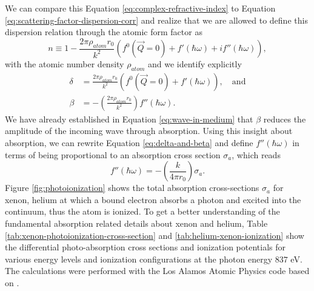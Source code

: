 We can compare this Equation \eqref{eq:complex-refractive-index} to Equation \eqref{eq:scattering-factor-dispersion-corr} and realize that we are allowed to define this dispersion relation through the atomic form factor as \citep[see][p.~76]{Als-Nielson-2011-JWS}
\begin{equation}
n\equiv 1- \frac{2\pi \rho_{atom}r_{0}}{k^{2}}\left(f^{0}\left(\vec{Q}=0\right)+f'\left(\hbar\omega\right)+i f''\left(\hbar\omega\right)\right),
\label{eq:eq:complex-refractive-index-atomic-factors}
\end{equation}
with the atomic number density $\rho_{atom}$ and we identify explicitly
\begin{align}
\delta &= \frac{2 \pi \rho_{atom} r_{0}}{k^{2}}\left(f^{0}\left(\vec{Q}=0\right)+f'\left(\hbar\omega\right)\right),\quad \text{and}\\
\beta &= - \left(\frac{2\pi \rho_{atom}r_{0}}{k^{2}}\right)f''\left(\hbar\omega\right).
\label{eq:delta-and-beta}
\end{align}
We have already established in Equation \eqref{eq:wave-in-medium} that $\beta$ reduces the amplitude of the incoming wave through absorption. Using this insight about absorption, we can rewrite Equation \eqref{eq:delta-and-beta} and define $f''\left(\hbar\omega\right)$ in terms of being proportional to an absorption cross section $\sigma_{a}$, which reads
\begin{equation}
f''\left(\hbar\omega\right)=-\left(\frac{k}{4\pi r_{0}}\right)\sigma_{a}.
\label{eq:f-2-definition}
\end{equation}
Figure \ref{fig:photoionization} shows the total absorption cross-sections $\sigma_{a}$ for xenon, helium at which a bound electron absorbs a photon and excited into the continuum, thus the atom is ionized. To get a better understanding of the fundamental absorption related details about xenon and helium, Table \ref{tab:xenon-photoionization-cross-section} and \ref{tab:helium-xenon-ionization} show the differential photo-absorption cross sections and ionization potentials for various energy levels and ionization configurations at the photon energy $837$ eV. The calculations were performed with the Los Alamos Atomic Physics code based on \citep{Cowan-1981-Cal}.
